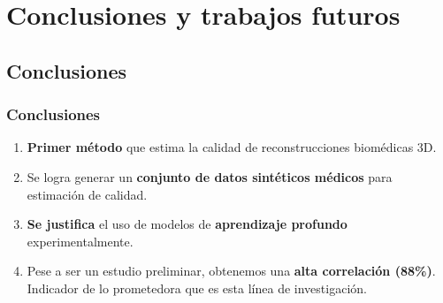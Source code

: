 \section{Conclusiones y trabajos futuros}
\subsection{Conclusiones}

\begin{frame}
  \frametitle{Conclusiones}
  \begin{enumerate}
    \item \textbf{Primer método} que estima la calidad de reconstrucciones biomédicas 3D.
    \item Se logra generar un \textbf{conjunto de datos sintéticos médicos} para estimación de calidad.
    \item \textbf{Se justifica} el uso de modelos de \textbf{aprendizaje profundo} \alert{experimentalmente}.
    \item Pese a ser un estudio preliminar, obtenemos una \textbf{alta correlación (88\%)}. Indicador 
      de lo prometedora que es esta línea de investigación.
  \end{enumerate}
\end{frame}

